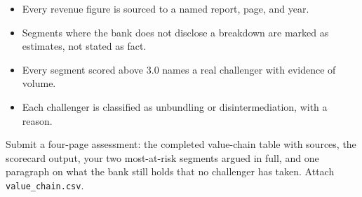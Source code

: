 \begin{verification}
\begin{itemize}
  \item Every revenue figure is sourced to a named report, page, and year.
  \item Segments where the bank does not disclose a breakdown are marked as estimates, not stated as fact.
  \item Every segment scored above 3.0 names a real challenger with evidence of volume.
  \item Each challenger is classified as unbundling or disintermediation, with a reason.
\end{itemize}
\end{verification}

\begin{labdeliverable}
Submit a four-page assessment: the completed value-chain table with sources, the scorecard output, your two most-at-risk segments argued in full, and one paragraph on what the bank still holds that no challenger has taken. Attach \texttt{value\_chain.csv}.
\end{labdeliverable}

